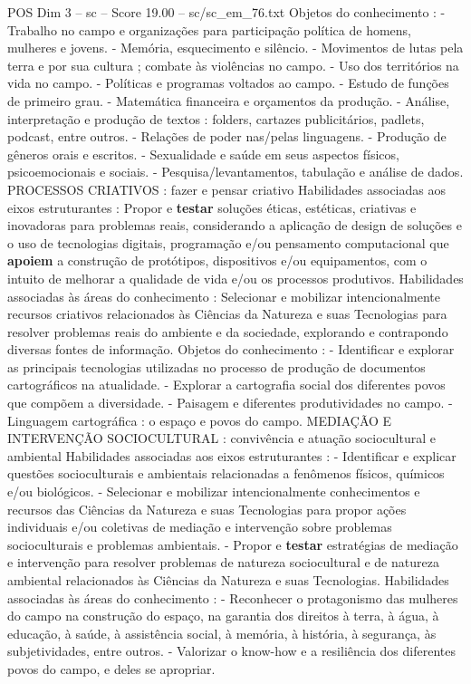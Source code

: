 \begin{textsample}{POS Dim 3 – sc – Score 19.00 – sc/sc\_em\_76.txt}
Objetos do conhecimento : - Trabalho no campo e organizações para participação política de homens, mulheres e jovens. - Memória, esquecimento e silêncio. - Movimentos de lutas pela terra e por sua cultura ; combate às violências no campo. - Uso dos territórios na vida no campo. - Políticas e programas voltados ao campo. - Estudo de funções de primeiro grau. - Matemática financeira e orçamentos da produção. - Análise, interpretação e produção de textos : folders, cartazes publicitários, padlets, podcast, entre outros. - Relações de poder nas/pelas linguagens. - Produção de gêneros orais e escritos. - Sexualidade e saúde em seus aspectos físicos, psicoemocionais e sociais. - Pesquisa/levantamentos, tabulação e análise de dados.
PROCESSOS CRIATIVOS : fazer e pensar criativo Habilidades associadas aos eixos estruturantes : Propor e \textbf{testar} soluções éticas, estéticas, criativas e inovadoras para problemas reais, considerando a aplicação de design de soluções e o uso de tecnologias digitais, programação e/ou pensamento computacional que \textbf{apoiem} a construção de protótipos, dispositivos e/ou equipamentos, com o intuito de melhorar a qualidade de vida e/ou os processos produtivos.
Habilidades associadas às áreas do conhecimento : Selecionar e mobilizar intencionalmente recursos criativos relacionados às Ciências da Natureza e suas Tecnologias para resolver problemas reais do ambiente e da sociedade, explorando e contrapondo diversas fontes de informação.
Objetos do conhecimento : - Identificar e explorar as principais tecnologias utilizadas no processo de produção de documentos cartográficos na atualidade. - Explorar a cartografia social dos diferentes povos que compõem a diversidade. - Paisagem e diferentes produtividades no campo. - Linguagem cartográfica : o espaço e povos do campo.
MEDIAÇÃO E INTERVENÇÃO SOCIOCULTURAL : convivência e atuação sociocultural e ambiental Habilidades associadas aos eixos estruturantes : - Identificar e explicar questões socioculturais e ambientais relacionadas a fenômenos físicos, químicos e/ou biológicos. - Selecionar e mobilizar intencionalmente conhecimentos e recursos das Ciências da Natureza e suas Tecnologias para propor ações individuais e/ou coletivas de mediação e intervenção sobre problemas socioculturais e problemas ambientais. - Propor e \textbf{testar} estratégias de mediação e intervenção para resolver problemas de natureza sociocultural e de natureza ambiental relacionados às Ciências da Natureza e suas Tecnologias.
Habilidades associadas às áreas do conhecimento : - Reconhecer o protagonismo das mulheres do campo na construção do espaço, na garantia dos direitos à terra, à água, à educação, à saúde, à assistência social, à memória, à história, à segurança, às subjetividades, entre outros. - Valorizar o know-how e a resiliência dos diferentes povos do campo, e deles se apropriar.

\end{textsample}
